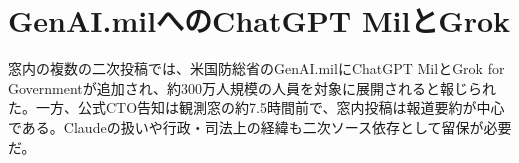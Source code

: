 \section{GenAI.milへのChatGPT MilとGrok}
窓内の複数の二次投稿では、米国防総省のGenAI.milにChatGPT MilとGrok for Governmentが追加され、約300万人規模の人員を対象に展開されると報じられた。一方、公式CTO告知は観測窓の約7.5時間前で、窓内投稿は報道要約が中心である。Claudeの扱いや行政・司法上の経緯も二次ソース依存として留保が必要だ。
